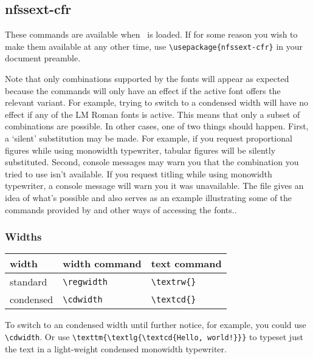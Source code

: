\documentclass[11pt,british]{article}
\begin{document}
\subsection{nfssext-cfr}

These commands are available when \ is loaded. If for some reason you wish to make them available at any other time, use \verb|\usepackage{nfssext-cfr}| in your document preamble.

Note that only combinations supported by the fonts will appear as expected because the commands will only have an effect if the active font offers the relevant variant. For example, trying to switch to a condensed width will have no effect if any of the LM Roman fonts is active. This means that only a subset of combinations are possible. In other cases,	one of two things should happen. First, a `silent' substitution may be made. For example, if you request proportional figures while using monowidth typewriter, tabular figures will be silently substituted. Second, console messages may warn you that the combination you tried to use isn't available.  If you request titling while using monowidth 	typewriter, a console message will warn you it was unavailable.  The file  gives an idea of what's possible and also serves as an example illustrating some of the commands provided by  and other ways of accessing the fonts..
	
\subsubsection{Widths}

	\begin{longtable}{lll}
		\toprule
		\textbf{width}	&	\textbf{width command}	&	\textbf{text command}\\\midrule\endhead
		\bottomrule\endfoot
		standard				&	\verb|\regwidth|					&	\verb|\textrw{}|\\
		condensed				&	\verb|\cdwidth|					&	\verb|\textcd{}|\\
	\end{longtable}

To switch to an condensed width until further notice, for example, you could use \verb|\cdwidth|. Or use \verb|\texttm{\textlg{\textcd{Hello, world!}}}| to typeset just the text  in a light-weight condensed monowidth typewriter.
\end{document}
